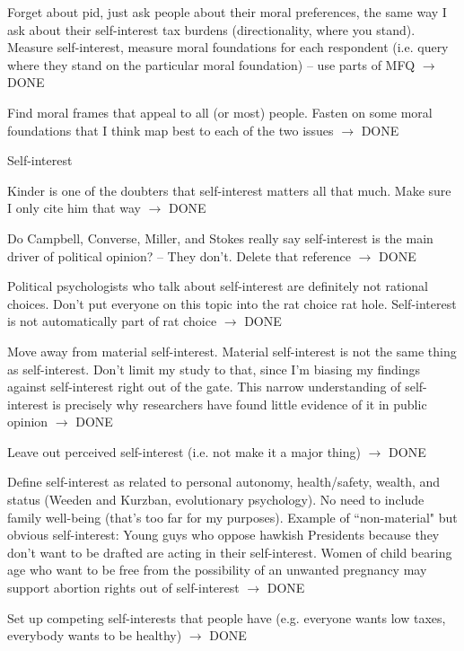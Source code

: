 \begin{coi}
\begin{coi}
				\item Forget about pid, just ask people about their moral preferences, the same way I ask about their self-interest tax burdens (directionality, where you stand). Measure self-interest, measure moral foundations for each respondent (i.e. query where they stand on the particular moral foundation) -- use parts of MFQ $\rightarrow$ DONE
				\item Find moral frames that appeal to all (or most) people. Fasten on some moral foundations that I think map best to each of the two issues $\rightarrow$ DONE
			\end{coi}
		\item Self-interest
			\begin{coi}
				\item Kinder is one of the doubters that self-interest matters all that much. Make sure I only cite him that way $\rightarrow$ DONE
				\item Do Campbell, Converse, Miller, and Stokes really say self-interest is the main driver of political opinion? -- They don't. Delete that reference $\rightarrow$ DONE
				\item Political psychologists who talk about self-interest are definitely not rational choices. Don't put everyone on this topic into the rat choice rat hole. Self-interest is not automatically part of rat choice $\rightarrow$ DONE
				\item Move away from material self-interest. Material self-interest is not the same thing as self-interest. Don't limit my study to that, since I'm biasing my findings against self-interest right out of the gate. This narrow understanding of self-interest is precisely why researchers have found little evidence of it in public opinion $\rightarrow$ DONE
				\item Leave out perceived self-interest (i.e. not make it a major thing) $\rightarrow$ DONE
				\item Define self-interest as related to personal autonomy, health/safety, wealth, and status (Weeden and Kurzban, evolutionary psychology). No need to include family well-being (that's too far for my purposes). Example of ``non-material" but obvious self-interest: Young guys who oppose hawkish Presidents because they don't want to be drafted are acting in their self-interest. Women of child bearing age who want to be free from the possibility of an unwanted pregnancy may support abortion rights out of self-interest $\rightarrow$ DONE
				\item Set up competing self-interests that people have (e.g. everyone wants low taxes, everybody wants to be healthy) $\rightarrow$ DONE

\end{coi}
\end{coi}
